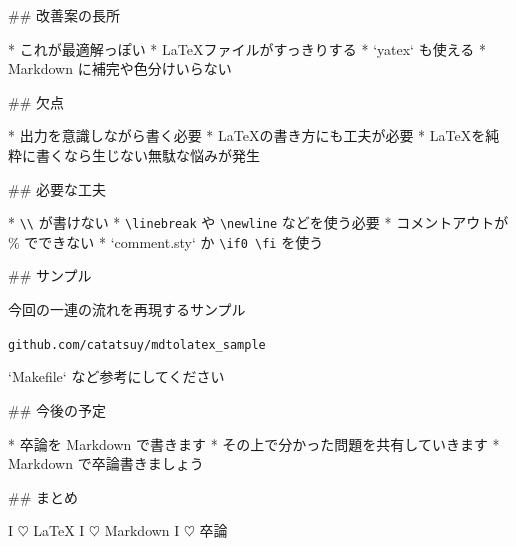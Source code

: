 ## 改善案の長所

* これが最適解っぽい
* \LaTeX ファイルがすっきりする
* `yatex` も使える
* Markdown に補完や色分けいらない

## 欠点

* 出力を意識しながら書く必要
* \LaTeX の書き方にも工夫が必要
* \LaTeX を純粋に書くなら生じない無駄な悩みが発生

## 必要な工夫

* \verb+\\+ が書けない
    * \verb+\linebreak+ や \verb+\newline+ などを使う必要
* コメントアウトが \% でできない
    * `comment.sty` か \verb/\if0 \fi/ を使う


## サンプル

今回の一連の流れを再現するサンプル

\begin{center}
\verb+github.com/catatsuy/mdtolatex_sample+
\end{center}

`Makefile` など参考にしてください


## 今後の予定

* 卒論を Markdown で書きます
* その上で分かった問題を共有していきます
* Markdown で卒論書きましょう

## まとめ

\vspace{-25pt}
\begin{center}
 \Huge
 I $\heartsuit$ \LaTeX \linebreak
 I $\heartsuit$ Markdown \linebreak
 I $\heartsuit$ 卒論
\end{center}
\fi